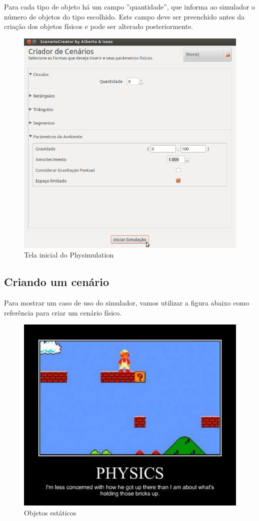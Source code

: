 Para cada tipo de objeto há um campo ''quantidade'', que informa ao simulador o número de objetos do tipo escolhido. Este campo deve ser preenchido antes da criação dos objetos físicos e pode ser alterado posteriormente.

\begin{figure}[H]
	\centering
	\includegraphics[scale=0.4]{images/physimulation-2.png}
	\caption{Tela inicial do Physimulation}
\end{figure}

\subsection{Criando um cenário}
Para mostrar um caso de uso do simulador, vamos utilizar a figura abaixo como referência para criar um cenário físico.

\begin{figure}[H]
  \centering
  \includegraphics[scale=0.6]{images/bricks.jpg}
  \caption{Objetos estáticos}
\end{figure}


